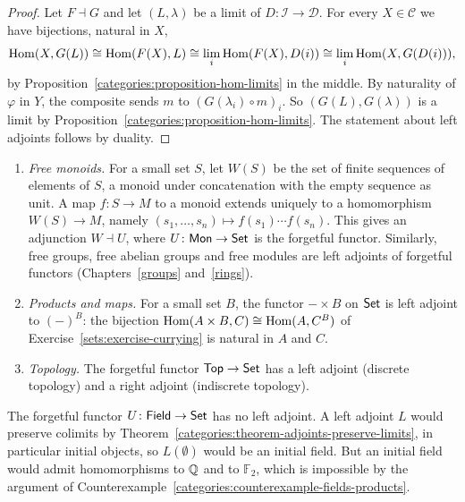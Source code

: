 \begin{proof}
Let $F \dashv G$ and let $(L, \lambda)$ be a limit of $D \colon \mathcal{I} \to \mathcal{D}$.
For every $X \in \mathcal{C}$ we have bijections, natural in $X$,
\[
\operatorname{Hom}(X, G(L)) \cong \operatorname{Hom}(F(X), L) \cong \lim_i \operatorname{Hom}(F(X), D(i)) \cong \lim_i \operatorname{Hom}(X, G(D(i))),
\]
by Proposition~\ref{categories:proposition-hom-limits} in the middle. By
naturality of $\varphi$ in $Y$, the composite sends $m$ to $(G(\lambda_i) \circ m)_i$.
So $(G(L), G(\lambda))$ is a limit by
Proposition~\ref{categories:proposition-hom-limits}. The statement about left
adjoints follows by duality.
\end{proof}

\begin{example}\label{categories:example-adjunctions}
\begin{enumerate}
\item \emph{Free monoids.} For a small set $S$, let $W(S)$ be the set of finite
sequences of elements of $S$, a monoid under concatenation with the empty
sequence as unit. A map $f \colon S \to M$ to a monoid extends uniquely to a
homomorphism $W(S) \to M$, namely $(s_1, \ldots, s_n) \mapsto f(s_1) \cdots f(s_n)$.
This gives an adjunction $W \dashv U$, where $U \colon \mathsf{Mon} \to \mathsf{Set}$ is
the forgetful functor. Similarly, free groups, free abelian groups and free
modules are left adjoints of forgetful functors (Chapters~\ref{groups}
and~\ref{rings}).
\item \emph{Products and maps.} For a small set $B$, the functor $- \times B$ on
$\mathsf{Set}$ is left adjoint to $(-)^B$: the bijection
$\operatorname{Hom}(A \times B, C) \cong \operatorname{Hom}(A, C^B)$ of Exercise~\ref{sets:exercise-currying} is
natural in $A$ and $C$.
\item \emph{Topology.} The forgetful functor $\mathsf{Top} \to \mathsf{Set}$ has a left
adjoint (discrete topology) and a right adjoint (indiscrete topology).
\end{enumerate}
\end{example}

\begin{counterexample}\label{categories:counterexample-fields-no-left-adjoint}
The forgetful functor $U \colon \mathsf{Field} \to \mathsf{Set}$ has no left adjoint. A left
adjoint $L$ would preserve colimits by
Theorem~\ref{categories:theorem-adjoints-preserve-limits}, in particular initial
objects, so $L(\emptyset)$ would be an initial field. But an initial field would
admit homomorphisms to $\mathbb{Q}$ and to $\mathbb{F}_2$, which is impossible by the
argument of Counterexample~\ref{categories:counterexample-fields-products}.
\end{counterexample}

